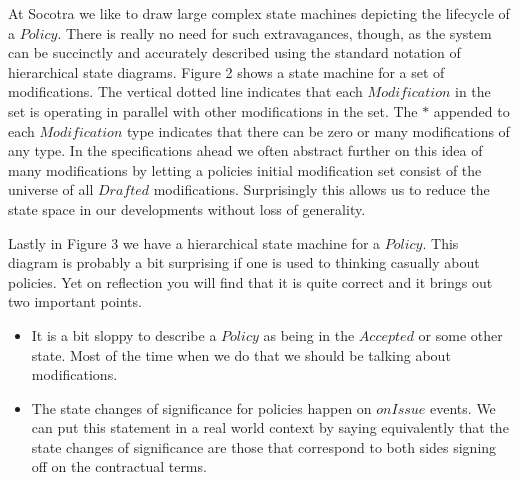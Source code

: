 
At Socotra we like to draw large complex state machines depicting the lifecycle of a $Policy$. There is really no need
for such extravagances, though, as the system can be succinctly and accurately described using the
standard notation of hierarchical state diagrams. Figure 2 shows a state machine for a set of modifications. The vertical
dotted line indicates that each $Modification$ in the set is operating in parallel with other modifications in the set. The
$*$ appended to each $Modification$ type indicates that there can be zero or many modifications of any type. In the
specifications ahead we often abstract further on this idea of many modifications by letting a policies initial
modification set consist of the universe of all $Drafted$ modifications. Surprisingly this allows us to reduce the
state space in our developments without loss of generality.

Lastly in Figure 3 we have a hierarchical state machine for a $Policy$. This diagram is probably
a bit surprising if one is used to thinking casually about policies. Yet on reflection you will
find that it is quite correct and it brings out two important points.
\begin{itemize}
\item It is a bit sloppy to describe a $Policy$ as being in the $Accepted$ or some other state.
  Most of the time when we do that we should be talking about modifications.
\item The state changes of significance for policies happen on $onIssue$ events. We can put this statement in
  a real world context by saying equivalently that the state changes of significance are those that
  correspond to both sides signing off on the contractual terms.
\end{itemize}

